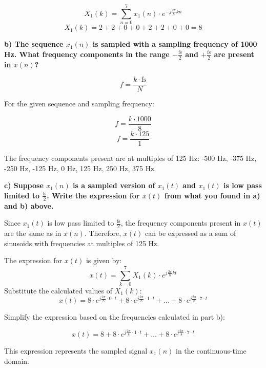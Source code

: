 \documentclass{article}
\begin{document}
\[ X_1(k) = \sum_{n=0}^{7} x_1(n) \cdot e^{-j \frac{2\pi}{8}kn} \]
\[ X_1(k) = 2 + 2 + 0 + 0 + 2 + 2 + 0 + 0 = 8 \]

\textbf{b) The sequence \(x_1(n)\) is sampled with a sampling frequency of 1000 Hz. What frequency components in the range \(-\frac{\text{fs}}{2}\) and \(+\frac{\text{fs}}{2}\) are present in \(x(n)\)?}

\[ f = \frac{k \cdot \text{fs}}{N} \]

For the given sequence and sampling frequency:

\[ f = \frac{k \cdot 1000}{8} \]
\[ f = \frac{k \cdot 125}{1} \]

The frequency components present are at multiples of 125 Hz: -500 Hz, -375 Hz, -250 Hz, -125 Hz, 0 Hz, 125 Hz, 250 Hz, 375 Hz.

\textbf{c) Suppose \(x_1(n)\) is a sampled version of \(x_1(t)\) and \(x_1(t)\) is low pass limited to \(\frac{\text{fs}}{2}\). Write the expression for \(x(t)\) from what you found in a) and b) above.}

Since \(x_1(t)\) is low pass limited to \(\frac{\text{fs}}{2}\), the frequency components present in \(x(t)\) are the same as in \(x(n)\). Therefore, \(x(t)\) can be expressed as a sum of sinusoids with frequencies at multiples of 125 Hz.

The expression for \(x(t)\) is given by:
\[ x(t) = \sum_{k=0}^{7} X_1(k) \cdot e^{j \frac{2\pi}{8}kt} \]
Substitute the calculated values of \(X_1(k)\):
\[ x(t) = 8 \cdot e^{j \frac{2\pi}{8} \cdot 0 \cdot t} + 8 \cdot e^{j \frac{2\pi}{8} \cdot 1 \cdot t} + \ldots + 8 \cdot e^{j \frac{2\pi}{8} \cdot 7 \cdot t} \]

Simplify the expression based on the frequencies calculated in part b):

\[ x(t) = 8 + 8 \cdot e^{j \frac{2\pi}{8} \cdot 1 \cdot t} + \ldots + 8 \cdot e^{j \frac{2\pi}{8} \cdot 7 \cdot t} \]

This expression represents the sampled signal \(x_1(n)\) in the continuous-time domain.
\end{document}
